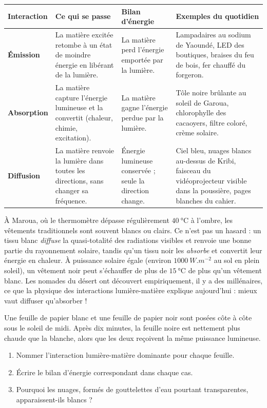 \documentclass[11pt]{article}
\begin{document}
\begin{center}
\begin{tabularx}{\linewidth}{|l|X|X|X|}
\hline
\rowcolor{popblueL} \textbf{Interaction} & \textbf{Ce qui se passe} & \textbf{Bilan d'énergie} & \textbf{Exemples du quotidien} \\
\hline
\textbf{Émission} & La matière excitée retombe à un état de moindre énergie en libérant de la lumière. & La matière perd l'énergie emportée par la lumière. & Lampadaires au sodium de Yaoundé, LED des boutiques, braises du feu de bois, fer chauffé du forgeron. \\
\hline
\textbf{Absorption} & La matière capture l'énergie lumineuse et la convertit (chaleur, chimie, excitation). & La matière gagne l'énergie perdue par la lumière. & Tôle noire brûlante au soleil de Garoua, chlorophylle des cacaoyers, filtre coloré, crème solaire. \\
\hline
\textbf{Diffusion} & La matière renvoie la lumière dans toutes les directions, sans changer sa fréquence. & Énergie lumineuse conservée ; seule la direction change. & Ciel bleu, nuages blancs au-dessus de Kribi, faisceau du vidéoprojecteur visible dans la poussière, pages blanches du cahier. \\
\hline
\end{tabularx}
\end{center}

\begin{savaistu}
À Maroua, où le thermomètre dépasse régulièrement $\SI{40}{\celsius}$ à l'ombre, les vêtements traditionnels sont souvent blancs ou clairs. Ce n'est pas un hasard : un tissu blanc \emph{diffuse} la quasi-totalité des radiations visibles et renvoie une bonne partie du rayonnement solaire, tandis qu'un tissu noir les \emph{absorbe} et convertit leur énergie en chaleur. À puissance solaire égale (environ $\SI{1000}{W.m^{-2}}$ au sol en plein soleil), un vêtement noir peut s'échauffer de plus de $\SI{15}{\celsius}$ de plus qu'un vêtement blanc. Les nomades du désert ont découvert empiriquement, il y a des millénaires, ce que la physique des interactions lumière-matière explique aujourd'hui : mieux vaut diffuser qu'absorber !
\end{savaistu}

\begin{exercice}
Une feuille de papier blanc et une feuille de papier noir sont posées côte à côte sous le soleil de midi. Après dix minutes, la feuille noire est nettement plus chaude que la blanche, alors que les deux reçoivent la même puissance lumineuse.
\begin{enumerate}
\item Nommer l'interaction lumière-matière dominante pour chaque feuille.
\item Écrire le bilan d'énergie correspondant dans chaque cas.
\item Pourquoi les nuages, formés de gouttelettes d'eau pourtant transparentes, apparaissent-ils blancs ?
\end{enumerate}
\end{exercice}
\end{document}
